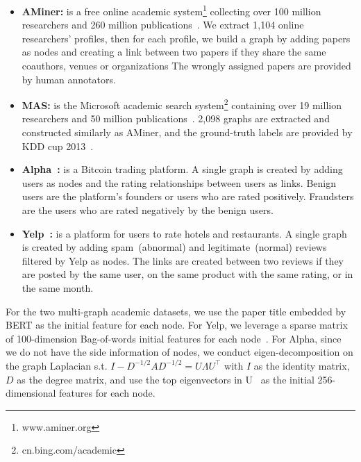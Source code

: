 \begin{itemize}[leftmargin=1em]
	\item \textbf{AMiner:} is a free online academic system\footnote{www.aminer.org} collecting over 100 million researchers and 260 million publications~\cite{tang2008arnetminer, zhang2021name}. 
	We extract 1,104 online researchers' profiles, then for each profile, we build a graph by adding papers as nodes and creating a link between two papers if they share the same coauthors, venues  or organizations
	The wrongly assigned papers are provided by human annotators.
	
	\item \textbf{MAS:} is the Microsoft academic search system\footnote{cn.bing.com/academic} containing over 19 million researchers and 50 million publications~\cite{sinha2015overview}. 2,098 graphs are extracted and constructed similarly as AMiner, and the ground-truth labels are provided by KDD cup 2013~\cite{roy2013microsoft}. 
	
	\item \textbf{Alpha~\cite{kumar2016edge}:} is a Bitcoin trading platform. A single graph is created by adding users as nodes and the rating relationships between users as links. Benign users are the platform's founders or users who are rated positively. Fraudsters are the users who are rated negatively by the benign users.
	
	\item \textbf{Yelp~\cite{rayana2015collective}:} is a platform for users to rate hotels and restaurants. A single graph is created by adding spam~(abnormal) and legitimate~(normal) reviews filtered by Yelp as nodes. The links are created between two reviews if they are posted by the same user, on the same product with the same rating, or in the same month. 
	
\end{itemize}

For the two multi-graph academic datasets, we use the paper title embedded by BERT as the initial feature for each node. For Yelp, we leverage a sparse matrix of 100-dimension Bag-of-words initial features for each node~\cite{dou2020enhancing}. For Alpha, since we do not have the side information of nodes, we conduct eigen-decomposition on the graph Laplacian s.t. $I-D^{-1/2}AD^{-1/2} = U\Lambda U^\top$ with $I$ as the identity matrix, $D$ as the degree matrix, and use the top eigenvectors in U~\cite{von2007tutorial} as the initial 256-dimensional features for each node.



